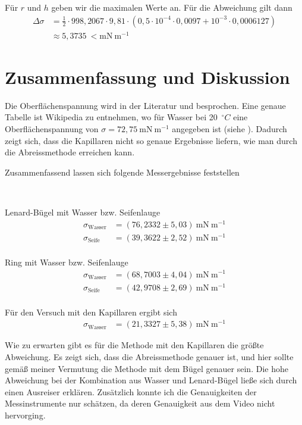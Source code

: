 \documentclass{article}
\begin{document}
Für $r$ und $h$ geben wir die maximalen Werte an. Für die Abweichung gilt dann
\begin{align*}
\Delta \sigma &= \frac12 \cdot 998,2067 \cdot 9,81 \cdot \left(0,5\cdot 10^{-4} \cdot 0,0097 + 10^{-3} \cdot 0,0006127\right)\\
&\approx 5,3735~< \text{mN}~\text{m}^{-1} 
\end{align*}


\newpage
\section{Zusammenfassung und Diskussion}

Die Oberflächenspannung wird in der Literatur \cite{demtr1} und \cite{giancoli} besprochen. Eine genaue Tabelle ist Wikipedia zu entnehmen, wo für Wasser bei 20~${}^\circ C$ eine Oberflächenspannung von $\sigma = 72,75~$mN$~$m${}^{-1}$ angegeben ist (siehe \cite{wikipedia2}). Dadurch zeigt sich, dass die Kapillaren nicht so genaue Ergebnisse liefern, wie man durch die Abreissmethode erreichen kann.

Zusammenfassend lassen sich folgende Messergebnisse feststellen

~

Lenard-Bügel mit Wasser bzw. Seifenlauge
\begin{align*}
\sigma_{\text{Wasser}} &= (76,2332 \pm 5,03)~\text{mN}~\text{m}^{-1}\\
\sigma_{\text{Seife}} &= (39,3622 \pm 2,52)~\text{mN}~\text{m}^{-1}\\
\end{align*}




Ring mit Wasser bzw. Seifenlauge
\begin{align*}
\sigma_{\text{Wasser}} &= (68,7003  \pm 4,04)~\text{mN}~\text{m}^{-1}\\
\sigma_{\text{Seife}} &= (42,9708 \pm 2,69)~\text{mN}~\text{m}^{-1}\\
\end{align*}



Für den Versuch mit den Kapillaren ergibt sich
\begin{align*}
\sigma_{\text{Wasser}} &= (21,3327 \pm 5,38)~\text{mN}~\text{m}^{-1}
\end{align*}


Wie zu erwarten gibt es für die Methode mit den Kapillaren die größte Abweichung. Es zeigt sich, dass die Abreissmethode genauer ist, und hier sollte gemäß meiner Vermutung die Methode mit dem Bügel genauer sein. Die hohe Abweichung bei der Kombination aus Wasser und Lenard-Bügel ließe sich durch einen Ausreiser erklären. Zusätzlich konnte ich die Genauigkeiten der Messinstrumente nur schätzen, da deren Genauigkeit aus dem Video nicht hervorging. 
\end{document}
